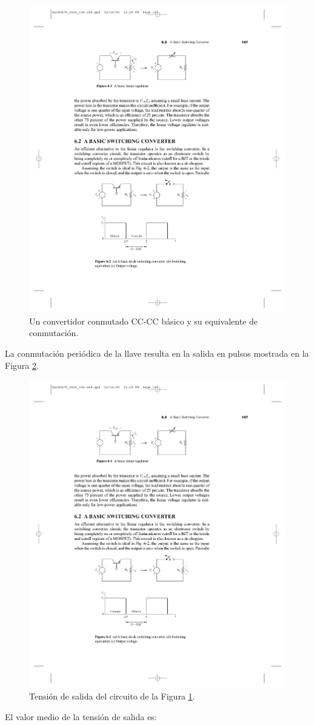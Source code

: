 \begin{figure}[hbt!]
    \centering
    \includegraphics[width=0.55\columnwidth]{Imágenes/Convertidor conmutado básico.pdf}
    \caption{Un convertidor conmutado CC-CC básico y su equivalente de conmutación.}
    \label{convertidor-basico}
\end{figure} 

La conmutación periódica de la llave resulta en la salida en pulsos mostrada en la Figura \ref{salida-conmutador}.

\begin{figure}[hbt!]
    \centering
    \includegraphics[width=0.55\columnwidth]{Imágenes/Salida del convertidor conmutado básico.pdf}
    \caption{Tensión de salida del circuito de la Figura \ref{convertidor-basico}.}
    \label{salida-conmutador}
\end{figure}

El valor medio de la tensión de salida es:

